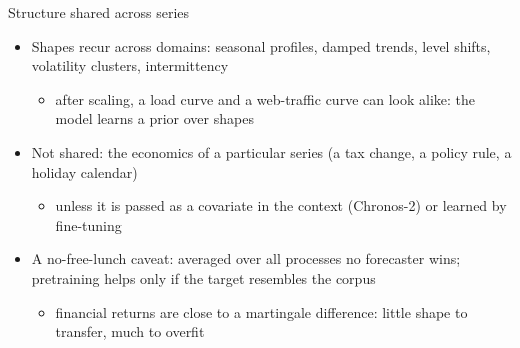 \begin{frame}{Structure shared across series}
\itemsize{\small}
\begin{itemize}
    \item Shapes recur across domains: seasonal profiles, damped trends, level shifts, volatility clusters, intermittency
    \begin{itemize}
        \item after scaling, a load curve and a web-traffic curve can look alike: the model learns a prior over shapes
    \end{itemize}
    \item Not shared: the economics of a particular series (a tax change, a policy rule, a holiday calendar)
    \begin{itemize}
        \item unless it is passed as a covariate in the context (Chronos-2) or learned by fine-tuning
    \end{itemize}
    \item A no-free-lunch caveat: averaged over all processes no forecaster wins; pretraining helps only if the target resembles the corpus
    \begin{itemize}
        \item financial returns are close to a martingale difference: little shape to transfer, much to overfit
    \end{itemize}
\end{itemize}
\end{frame}

